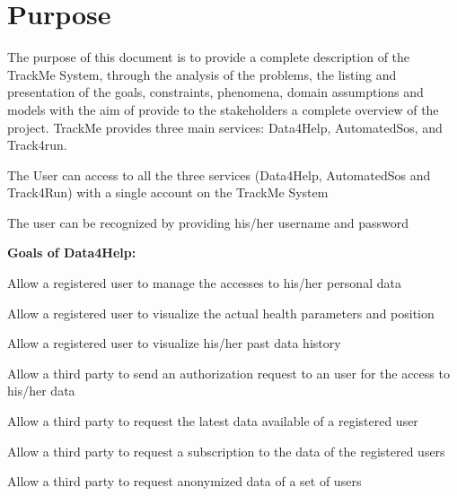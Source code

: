 \section{Purpose}
The purpose of this document is to provide a complete description of the TrackMe System, through the analysis of the problems, the listing and presentation of the goals, constraints, phenomena, domain assumptions and models with the aim of provide to the stakeholders a complete overview of the project. TrackMe provides three main services: Data4Help, AutomatedSos, and Track4run.

\begin{goalList}
\begin{enumerate}[label={[}G\arabic*{]}]

    \item \label{goal:trackme1} The User can access to all the three services (Data4Help, AutomatedSos and Track4Run) with a single account on the TrackMe System
    \item \label{goal:trackme2}The user can be recognized by providing his/her username and password
    
\end{enumerate}

\textbf{Goals of Data4Help:}
\begin{enumerate}[label={[}G3.\arabic*{]}]

    \item \label{goal:user1}Allow a registered user to manage the accesses to his/her personal data
    \item \label{goal:user2}Allow a registered user to visualize the actual health parameters and position
    \item \label{goal:user3}Allow a registered user to visualize his/her past data history

    \item \label{goal:parties1}Allow a third party to send an authorization request to an user for the access to his/her data
    \item \label{goal:parties2}Allow a third party to  request the latest data available  of a registered user

    \item \label{goal:parties3}Allow a third party to request a subscription to the data of the registered users

    \item \label{goal:parties4}Allow a third party to request anonymized data of a set of users


\end{enumerate}
\end{goalList}
